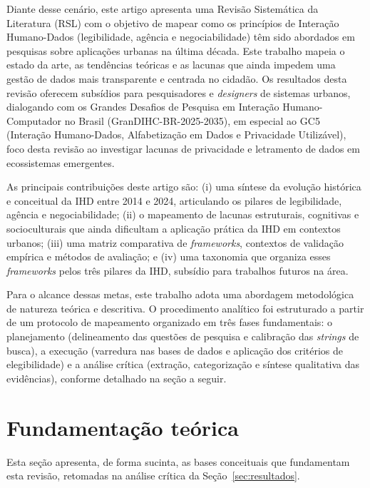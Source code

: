 \documentclass[12pt]{article}
\begin{document}
    Diante desse cenário, este artigo apresenta uma Revisão Sistemática da Literatura (RSL) com o objetivo de mapear como os princípios de Interação Humano-Dados (legibilidade, agência e negociabilidade) \cite{mortier2015humandatainteractionhumanface} têm sido abordados em pesquisas sobre aplicações urbanas na última década. Este trabalho mapeia o estado da arte, as tendências teóricas e as lacunas que ainda impedem uma gestão de dados mais transparente e centrada no cidadão. Os resultados desta revisão oferecem subsídios para pesquisadores e \textit{designers} de sistemas urbanos, dialogando com os Grandes Desafios de Pesquisa em Interação Humano-Computador no Brasil (GranDIHC-BR-2025-2035), em especial ao GC5 (Interação Humano-Dados, Alfabetização em Dados e Privacidade Utilizável), foco desta revisão ao investigar lacunas de privacidade e letramento de dados em ecossistemas emergentes.

    As principais contribuições deste artigo são: (i) uma síntese da evolução histórica e conceitual da IHD entre 2014 e 2024, articulando os pilares de legibilidade, agência e negociabilidade; (ii) o mapeamento de lacunas estruturais, cognitivas e socioculturais que ainda dificultam a aplicação prática da IHD em contextos urbanos; (iii) uma matriz comparativa de \textit{frameworks}, contextos de validação empírica e métodos de avaliação; e (iv) uma taxonomia que organiza esses \textit{frameworks} pelos três pilares da IHD, subsídio para trabalhos futuros na área.

    Para o alcance dessas metas, este trabalho adota uma abordagem metodológica de natureza teórica e descritiva. O procedimento analítico foi estruturado a partir de um protocolo de mapeamento organizado em três fases fundamentais: o planejamento (delineamento das questões de pesquisa e calibração das \textit{strings} de busca), a execução (varredura nas bases de dados e aplicação dos critérios de elegibilidade) e a análise crítica (extração, categorização e síntese qualitativa das evidências), conforme detalhado na seção a seguir.
    

\raggedbottom
\section{Fundamentação teórica}
\label{sec:referencial}

Esta seção apresenta, de forma sucinta, as bases conceituais que fundamentam esta revisão, retomadas na análise crítica da Seção~\ref{sec:resultados}.
\end{document}
